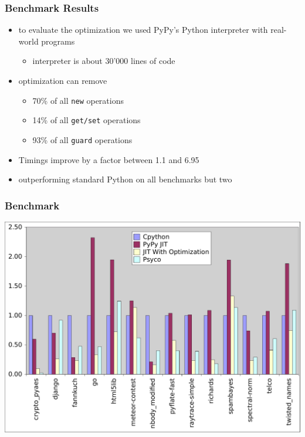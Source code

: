 \documentclass[utf8x]{beamer}
\begin{document}
\begin{frame}
  \frametitle{Benchmark Results}
  \begin{itemize}
      \item to evaluate the optimization we used PyPy's Python interpreter with real-world programs
      \begin{itemize}
          \item interpreter is about 30'000 lines of code
      \end{itemize}
      \pause
      \item optimization can remove
      \begin{itemize}
          \item 70\% of all \texttt{new} operations
          \item 14\% of all \texttt{get/set} operations
          \item 93\% of all \texttt{guard} operations
      \end{itemize}
      \pause
      \item Timings improve by a factor between 1.1 and 6.95
      \item outperforming standard Python on all benchmarks but two
  \end{itemize}
\end{frame}

\begin{frame}
  \frametitle{Benchmark}
  \includegraphics[scale=0.4]{figures/benchmarks}
\end{frame}
\end{document}

